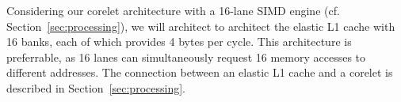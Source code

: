 Considering our corelet architecture with a 16-lane SIMD engine (cf. Section~\ref{sec:processing}), we will architect to architect the elastic L1 cache with 16 banks, each of which provides 4 bytes per cycle. 
This architecture is preferrable, as 16 lanes can simultaneously request 16 memory accesses to different addresses.
The connection between an elastic L1 cache and a corelet is described in Section~\ref{sec:processing}.

